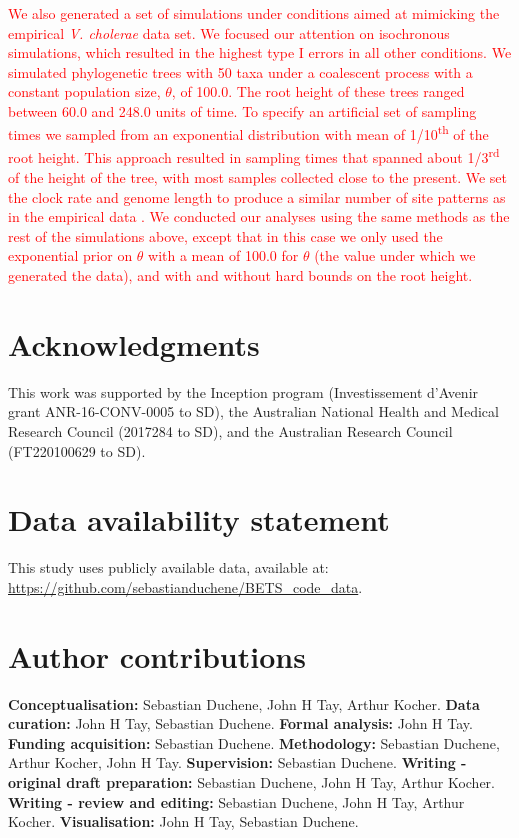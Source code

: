 \documentclass[10pt,letterpaper]{article}
\begin{document}
\textcolor{red}{We also generated a set of simulations under conditions aimed at mimicking the empirical \textit{V. cholerae} data set. We focused our attention on isochronous simulations, which resulted in the highest type I errors in all other conditions. We simulated phylogenetic trees with 50 taxa under a coalescent process with a constant population size, $\theta$, of 100.0. The root height of these trees ranged between 60.0 and 248.0 units of time. To specify an artificial set of sampling times we sampled from an exponential distribution with mean of 1/10\textsuperscript{th} of the root height. This approach resulted in sampling times that spanned about 1/3\textsuperscript{rd} of the height of the tree, with most samples collected close to the present. We set the clock rate and genome length to produce a similar number of site patterns as in the empirical data \cite{devault2014second}. We conducted our analyses using the same methods as the rest of the simulations above, except that in this case we only used the exponential prior on $\theta$ with a mean of 100.0 for $\theta$ (the value under which we generated the data), and with and without hard bounds on the root height.}

\section*{Acknowledgments}
This work was supported by the Inception program (Investissement d’Avenir grant ANR-16-CONV-0005 to SD), the Australian National Health and Medical Research Council (2017284 to SD), and the Australian Research Council (FT220100629 to SD).


\section*{Data availability statement}
This study uses publicly available data, available at: \url{https://github.com/sebastianduchene/BETS\_code\_data}.

\section*{Author contributions}

\textbf{Conceptualisation:} Sebastian Duchene, John H Tay, Arthur Kocher. \newline
\textbf{Data curation:} John H Tay, Sebastian Duchene. \newline
\textbf{Formal analysis:} John H Tay. \newline
\textbf{Funding acquisition:} Sebastian Duchene.  \newline
\textbf{Methodology:} Sebastian Duchene, Arthur Kocher, John H Tay.  \newline
\textbf{Supervision:} Sebastian Duchene. \newline
\textbf{Writing - original draft preparation:} Sebastian Duchene, John H Tay, Arthur Kocher. \newline
\textbf{Writing - review and editing:} Sebastian Duchene, John H Tay, Arthur Kocher. \newline
\textbf{Visualisation:} John H Tay, Sebastian Duchene. \newline
\end{document}
